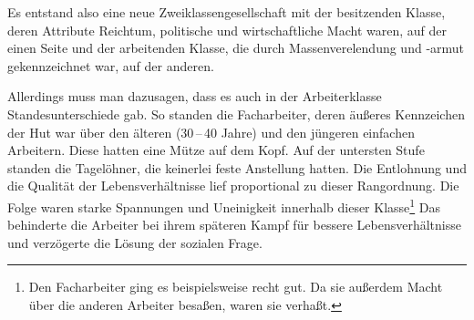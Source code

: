 Es entstand also eine neue Zweiklassengesellschaft mit der besitzenden
Klasse, deren Attribute Reichtum, politische und wirtschaftliche Macht
waren, auf der einen Seite und der arbeitenden Klasse, die durch
Massenverelendung und -armut gekennzeichnet war, auf der anderen.

Allerdings muss man dazusagen, dass es auch in der Arbeiterklasse
Standesunterschiede gab. So standen die Facharbeiter, deren äußeres
Kennzeichen der Hut war über den älteren (30\,--\,40 Jahre) und den
jüngeren einfachen Arbeitern. Diese hatten eine Mütze auf dem Kopf.
Auf der untersten Stufe standen die Tagelöhner, die keinerlei feste
Anstellung hatten. Die Entlohnung und die Qualität der
Lebensverhältnisse lief proportional zu dieser Rangordnung. Die Folge
waren starke Spannungen und Uneinigkeit innerhalb dieser
Klasse\footnote{Den Facharbeiter ging es beispielsweise recht gut. Da
sie außerdem Macht über die anderen Arbeiter besaßen, waren sie
verhaßt.} Das behinderte die Arbeiter bei ihrem späteren Kampf für
bessere Lebensverhältnisse und verzögerte die Lösung der sozialen
Frage.

\endinput
